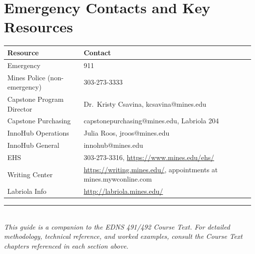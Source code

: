 \documentclass[11pt,letterpaper]{article}
\begin{document}
\section{Emergency Contacts and Key Resources}

\begin{center}\small
\begin{tabularx}{\textwidth}{lX}
\toprule
\textbf{Resource} & \textbf{Contact} \\
\midrule
Emergency & 911 \\
Mines Police (non-emergency) & 303-273-3333 \\
Capstone Program Director & Dr.\ Kristy Csavina, kcsavina@mines.edu \\
Capstone Purchasing & capstonepurchasing@mines.edu, Labriola 204 \\
InnoHub Operations & Julia Roos, jroos@mines.edu \\
InnoHub General & innohub@mines.edu \\
EHS & 303-273-3316, \url{https://www.mines.edu/ehs/} \\
Writing Center & \url{https://writing.mines.edu/}, appointments at mines.mywconline.com \\
Labriola Info & \url{http://labriola.mines.edu/} \\
\bottomrule
\end{tabularx}
\end{center}

\vspace{1cm}
\begin{center}
\textcolor{minesgold}{\rule{0.5\textwidth}{1.5pt}}\\[8pt]
{\small\textit{This guide is a companion to the EDNS 491/492 Course Text. For detailed methodology, technical reference, and worked examples, consult the Course Text chapters referenced in each section above.}}
\end{center}
\end{document}
